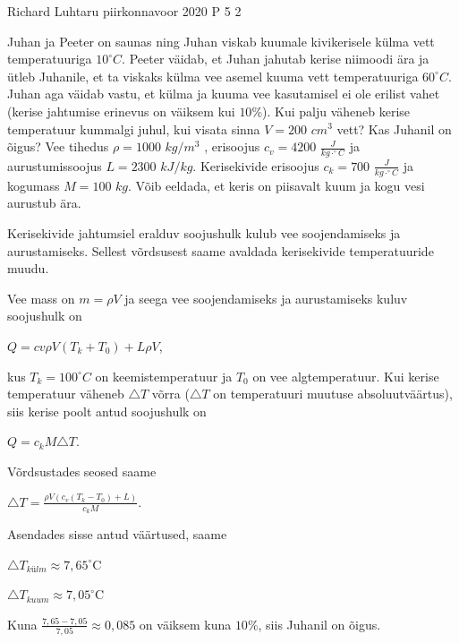 {Richard Luhtaru} %
{piirkonnavoor} %
{2020} %
{P 5} %
{2} %
{

\ifStatement
Juhan ja Peeter on saunas ning Juhan viskab kuumale kivikerisele külma vett temperatuuriga $10^{\circ}C$. Peeter väidab, et Juhan jahutab kerise niimoodi ära ja ütleb Juhanile, et ta viskaks külma vee asemel kuuma vett temperatuuriga $60 ^{\circ}C$. Juhan aga väidab vastu, et külma ja kuuma vee kasutamisel ei ole erilist vahet (kerise jahtumise erinevus on väiksem kui $10\%$). Kui palju väheneb kerise temperatuur kummalgi juhul, kui visata sinna $V = 200$ $cm^3$ vett? Kas Juhanil on õigus? Vee tihedus $\rho = 1000$ $kg/m^3$ , erisoojus $c_v = 4200$  $\frac{J}{kg \cdot ^{\circ}C}$ ja aurustumissoojus $L = 2300$ $kJ/kg$. Kerisekivide erisoojus $c_k = 700$ $\frac{J}{kg \cdot ^{\circ}C}$ ja kogumass $M = 100$ $kg$. Võib eeldada, et keris on piisavalt kuum ja kogu vesi aurustub ära.
\fi

\ifHint
Kerisekivide jahtumsiel eralduv soojushulk kulub vee soojendamiseks ja aurustamiseks. Sellest võrdsusest saame avaldada kerisekivide temperatuuride muudu.
\fi

\ifSolution
Vee mass on $m = \rho V$ ja seega vee soojendamiseks ja aurustamiseks kuluv soojushulk on
\begin{center}
$ Q = cv \rho V (T_k + T_0) + L \rho V$,
\end{center}
kus $T_k = 100^{\circ}C$ on keemistemperatuur ja $T_0$ on vee algtemperatuur. Kui kerise temperatuur väheneb $\triangle T$ võrra ($\triangle T$ on temperatuuri muutuse absoluutväärtus), siis kerise poolt antud soojushulk on
\begin{center}
$Q = c_k M \triangle T$.
\end{center}
Võrdsustades seosed saame
\begin{center}
$\triangle T = \frac{\rho V (c_v (T_k - T_0) + L)}{c_k M}$.
\end{center}
Asendades sisse antud väärtused, saame 
\begin{center}
$\triangle T_{külm} \approx 7,65 ^{\circ}$C
\end{center}
\begin{center}
$\triangle T_{kuum} \approx 7,05 ^{\circ}$C
\end{center}
Kuna $\frac{7,65 - 7,05}{7,05} \approx 0,085$ on väiksem kuna $10\%$, siis Juhanil on õigus.
\fi
}